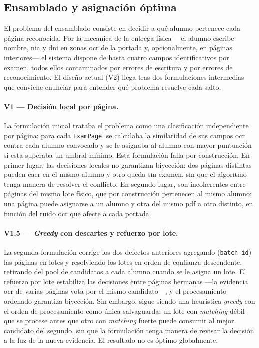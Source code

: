 \subsection{Ensamblado y asignación óptima}
\label{SS:DES-INGEST-ASSEMBLY}

El problema del ensamblado consiste en decidir a qué alumno pertenece
cada página reconocida. Por la mecánica de la entrega física —el alumno
escribe nombre, \acs{nia} y \acs{dni} en zonas \acs{ocr} de la portada
y, opcionalmente, en páginas interiores— el sistema dispone de hasta
cuatro campos identificativos por examen, todos ellos contaminados por
errores de escritura y por errores de reconocimiento. El diseño actual
(V2) llega tras dos formulaciones intermedias que conviene enunciar
para entender qué problema resuelve cada salto.

\paragraph{V1 — Decisión local por página.}
La formulación inicial trataba el problema como una clasificación
independiente por página: para cada \texttt{ExamPage}, se calculaba la
similaridad de sus campos \acs{ocr} contra cada alumno convocado y se
le asignaba al alumno con mayor puntuación si esta superaba un umbral
mínimo. Esta formulación falla por construcción. En primer lugar, las
decisiones locales no garantizan biyección: dos páginas distintas
pueden caer en el mismo alumno y otro queda sin examen, sin que el
algoritmo tenga manera de resolver el conflicto. En segundo lugar, son
incoherentes entre páginas del mismo lote físico, que por construcción
pertenecen al mismo alumno: una página puede asignarse a un alumno y
otra del mismo \acs{pdf} a otro distinto, en función del ruido \acs{ocr}
que afecte a cada portada.

\paragraph{V1.5 — \textit{Greedy} con descartes y refuerzo por lote.}
La segunda formulación corrige los dos defectos anteriores agregando
(\texttt{batch\_id}) las páginas en lotes y resolviendo los lotes en
orden de confianza descendente, retirando del pool de candidatos a cada
alumno cuando se le asigna un lote. El refuerzo por lote estabiliza las
decisiones entre páginas hermanas —la evidencia \acs{ocr} de varias
páginas vota por el mismo candidato—, y el procesamiento ordenado
garantiza biyección. Sin embargo, sigue siendo una heurística
\textit{greedy} con el orden de procesamiento como única salvaguarda: un
lote con \textit{matching} débil que se procese antes que otro con
\textit{matching} fuerte puede consumir al mejor candidato del segundo,
sin que la formulación tenga manera de revisar la decisión a la luz de
la nueva evidencia. El resultado no es óptimo globalmente.

